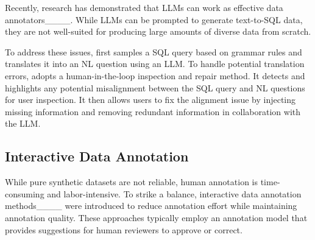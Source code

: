 Recently, research has demonstrated that LLMs can work as effective data annotators____. 
While LLMs can be prompted to generate text-to-SQL data, they are not well-suited for producing large amounts of diverse data from scratch. 

To address these issues, {\tool} first samples a SQL query based on grammar rules and translates it into an NL question using an LLM. To handle potential translation errors, {\tool} adopts a human-in-the-loop inspection and repair method. It detects and highlights any potential misalignment between the SQL query and NL questions for user inspection. It then allows users to fix the alignment issue by injecting missing information and removing redundant information in collaboration with the LLM.








\subsection{Interactive Data Annotation}

While pure synthetic datasets are not reliable, human annotation is time-consuming and labor-intensive.
To strike a balance, interactive data annotation methods____ were introduced to reduce annotation effort while maintaining annotation quality. 
These approaches typically employ an annotation model that provides suggestions for human reviewers to approve or correct.

